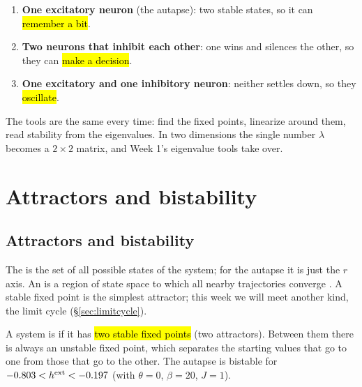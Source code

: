 \begin{intuition}
\begin{enumerate}
  \item \textbf{One excitatory neuron} (the autapse): two stable states, so it can \hl{remember a bit}.
  \item \textbf{Two neurons that inhibit each other}: one wins and silences the other, so they can \hl{make a decision}.
  \item \textbf{One excitatory and one inhibitory neuron}: neither settles down, so they \hl{oscillate}.
\end{enumerate}
The tools are the same every time: find the fixed points, linearize around them, read stability from the eigenvalues. In two dimensions the single number $\lambda$ becomes a $2\times2$ matrix, and Week 1's eigenvalue tools take over.
\end{intuition}

\section{Attractors and bistability}

\subsection{Attractors and bistability}

\begin{defn}
The  is the set of all possible states of the system; for the autapse it is just the $r$ axis.
An  is a region of state space to which all nearby trajectories converge . A stable fixed point is the simplest attractor; this week we will meet another kind, the limit cycle (\S\ref{sec:limitcycle}).
\end{defn}

\begin{defn}[Bistability]
A system is  if it has \hl{two stable fixed points} (two attractors). Between them there is always an unstable fixed point, which separates the starting values that go to one from those that go to the other.
The autapse is bistable for $-0.803<h^{\text{ext}}<-0.197$ (with $\theta=0$, $\beta=20$, $J=1$).
\end{defn}

